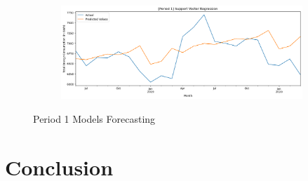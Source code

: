 \documentclass[runningheads]{llncs}
\begin{document}
\begin{figure}[h]
\begin{subfigure}[h]{\textwidth}
         \caption{}
         \label{fig:modelRF-p1}
    \end{subfigure}
    \begin{subfigure}[h]{\textwidth}
         \centering
         \includegraphics[width=\textwidth]{figures/svr/p1-1-SVR.png}
         \caption{}
         \label{fig:modelRF-p2}
    \end{subfigure}
    \caption{Period 1 Models Forecasting}
    \label{fig:fig1}
\end{figure}

\section{Conclusion}
\end{document}
